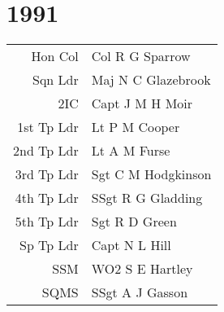 \chapter*{1991}

\vspace*{10mm}

\begin{center}
  \begin{tabular}{rl}
    Hon Col & Col R G Sparrow \\
    Sqn Ldr & Maj N C Glazebrook \\
    2IC & Capt J M H Moir \\
    1st Tp Ldr & Lt P M Cooper \\
    2nd Tp Ldr & Lt A M Furse \\
    3rd Tp Ldr & Sgt C M Hodgkinson \\
    4th Tp Ldr & SSgt R G Gladding \\
    5th Tp Ldr & Sgt R D Green \\
    Sp Tp Ldr & Capt N L Hill \\
    SSM & WO2 S E Hartley \\
    SQMS & SSgt A J Gasson \\
  \end{tabular}
\end{center}

\vspace*{10mm}

